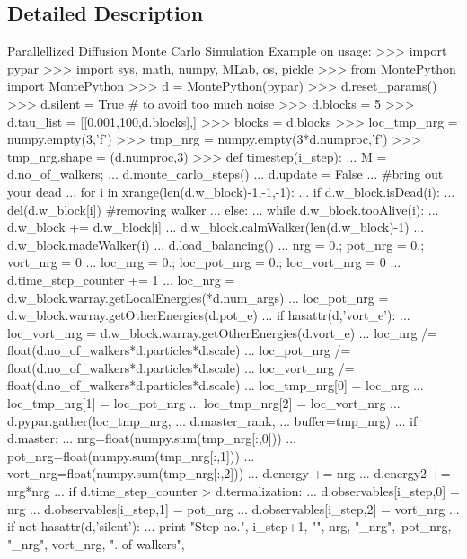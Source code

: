 \subsection{Detailed Description}
\begin{DoxyVerb}Parallellized Diffusion Monte Carlo Simulation
Example on usage:
>>> import pypar
>>> import sys, math, numpy, MLab, os, pickle
>>> from MontePython import MontePython
>>> d = MontePython(pypar)
>>> d.reset_params()
>>> d.silent = True # to avoid too much noise
>>> d.blocks = 5
>>> d.tau_list = [[0.001,100,d.blocks],]
>>> blocks = d.blocks
>>> loc_tmp_nrg = numpy.empty(3,'f')
>>> tmp_nrg = numpy.empty(3*d.numproc,'f')
>>> tmp_nrg.shape = (d.numproc,3)
>>> def timestep(i_step):
...     M = d.no_of_walkers;
...     d.monte_carlo_steps()
...     d.update = False
...     #bring out your dead
...     for i in xrange(len(d.w_block)-1,-1,-1):
...         if d.w_block.isDead(i):
...             del(d.w_block[i])  #removing walker
...         else:
...             while d.w_block.tooAlive(i):
...                 d.w_block += d.w_block[i]
...                 d.w_block.calmWalker(len(d.w_block)-1)
...                 d.w_block.madeWalker(i)
...     d.load_balancing()
...     nrg = 0.; pot_nrg = 0.; vort_nrg = 0
...     loc_nrg = 0.; loc_pot_nrg = 0.; loc_vort_nrg = 0
...     d.time_step_counter += 1
...     loc_nrg     = d.w_block.warray.getLocalEnergies(*d.num_args)
...     loc_pot_nrg = d.w_block.warray.getOtherEnergies(d.pot_e)
...     if hasattr(d,'vort_e'):
...         loc_vort_nrg = d.w_block.warray.getOtherEnergies(d.vort_e)
...     loc_nrg      /= float(d.no_of_walkers*d.particles*d.scale)
...     loc_pot_nrg  /= float(d.no_of_walkers*d.particles*d.scale)
...     loc_vort_nrg /= float(d.no_of_walkers*d.particles*d.scale)
...     loc_tmp_nrg[0] = loc_nrg
...     loc_tmp_nrg[1] = loc_pot_nrg
...     loc_tmp_nrg[2] = loc_vort_nrg
...     d.pypar.gather(loc_tmp_nrg,
...                    d.master_rank,
...                    buffer=tmp_nrg)
...     if d.master:
...         nrg=float(numpy.sum(tmp_nrg[:,0]))
...         pot_nrg=float(numpy.sum(tmp_nrg[:,1]))
...         vort_nrg=float(numpy.sum(tmp_nrg[:,2]))
...         d.energy  += nrg
...         d.energy2 += nrg*nrg
...         if d.time_step_counter > d.termalization:
...             d.observables[i_step,0] = nrg
...             d.observables[i_step,1] = pot_nrg
...             d.observables[i_step,2] = vort_nrg
...         if not hasattr(d,'silent'):
...             print "Step no.", i_step+1, "\tnrg", nrg, "\tpot_nrg",\
               pot_nrg, "\tvort_nrg", vort_nrg, "\tno. of walkers",\

\end{DoxyVerb}

